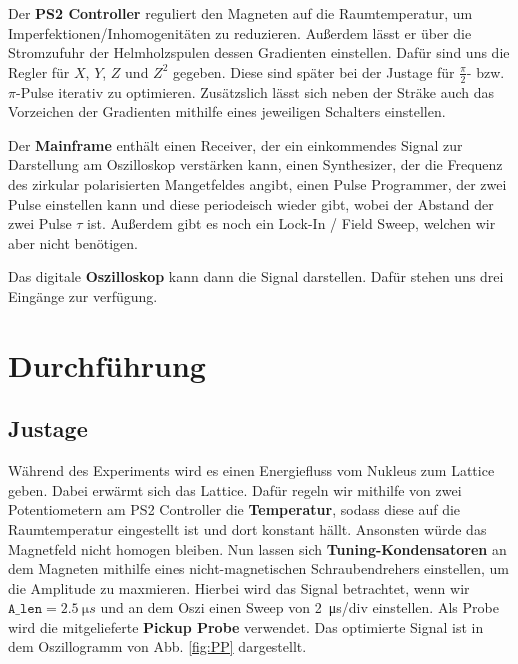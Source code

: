 \documentclass[10pt]{article}
\begin{document}
\begin{multicols}{2}
  Der \textbf{PS2 Controller} reguliert den Magneten auf die Raumtemperatur, um Imperfektionen/Inhomogenitäten zu reduzieren. Außerdem lässt er über die Stromzufuhr der Helmholzspulen dessen Gradienten einstellen. Dafür sind uns die Regler für $X$, $Y$, $Z$ und $Z^2$ gegeben. Diese sind später bei der Justage für $\frac{\pi}{2}$- bzw. $\pi$-Pulse iterativ zu optimieren. Zusätzslich lässt sich neben der Sträke auch das Vorzeichen der Gradienten mithilfe eines jeweiligen Schalters einstellen.

  Der \textbf{Mainframe} enthält einen Receiver, der ein einkommendes Signal zur Darstellung am Oszilloskop verstärken kann, einen Synthesizer, der die Frequenz des zirkular polarisierten Mangetfeldes angibt, einen Pulse Programmer, der zwei Pulse einstellen kann und diese periodeisch wieder gibt, wobei der Abstand der zwei Pulse $\tau$ ist. Außerdem gibt es noch ein Lock-In / Field Sweep, welchen wir aber nicht benötigen.

  Das digitale \textbf{Oszilloskop} kann dann die Signal darstellen. Dafür stehen uns drei Eingänge zur verfügung. 

  \section{Durchführung}
  \subsection{Justage}
  Während des Experiments wird es einen Energiefluss vom Nukleus zum Lattice geben. Dabei erwärmt sich das Lattice. Dafür regeln wir mithilfe von zwei Potentiometern am PS2 Controller die \textbf{Temperatur}, sodass diese auf die Raumtemperatur eingestellt ist und dort konstant hällt. Ansonsten würde das Magnetfeld nicht homogen bleiben. Nun lassen sich \textbf{Tuning-Kondensatoren} an dem Magneten mithilfe eines nicht-magnetischen Schraubendrehers einstellen, um die Amplitude zu maxmieren. Hierbei wird das Signal betrachtet, wenn wir $\texttt{A_len}=\SI{2.5}{\micro s}$ und an dem Oszi einen Sweep von \SI{2}{\micro s/div} einstellen. Als Probe wird die mitgelieferte \textbf{Pickup Probe} verwendet. Das optimierte Signal ist in dem Oszillogramm von Abb. \ref{fig:PP} dargestellt.
  

\end{multicols}
\end{document}
